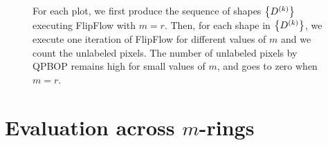\begin{figure}
\begin{minipage}[b]{0.5\textwidth}
\end{minipage}
\caption{For each plot, we first produce the sequence of shapes $\left\{ D^{(k)} \right\}$ executing FlipFlow with $m=r$. Then, for each shape in $\left\{ D^{(k)} \right\}$, we execute one iteration of FlipFlow for different values of $m$ and we count the unlabeled pixels. The number of unlabeled pixels by QPBOP remains high for small values of $m$, and goes to zero when $m=r$. %
}
\label{ch6:fig:unlabeled-versus-iterations}
\end{figure}



\section{Evaluation across $m$-rings}
\label{ch6:sec:evaluation-across-rings}

